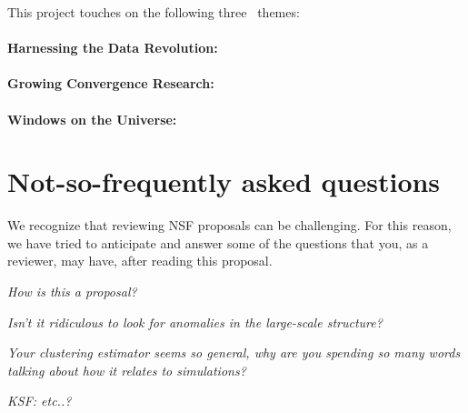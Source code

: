 \documentclass[12pt, fullpage, letterpaper]{article}
\begin{document}
This project touches on the following three \NSF\ themes:

\paragraph{Harnessing the Data Revolution:}

\paragraph{Growing Convergence Research:}

\paragraph{Windows on the Universe:}

\section{Not-so-frequently asked questions}

We recognize that reviewing NSF proposals can be challenging.
For this reason, we have tried to anticipate and answer some of the
questions that you, as a reviewer, may have, after reading this
proposal.

\textit{How is this a  proposal?}

\textit{Isn't it ridiculous to look for anomalies in the large-scale structure?}

\textit{Your clustering estimator seems so general, why are you spending so many words talking about how it relates to simulations?}

\textit{KSF: etc..?}
\end{document}
